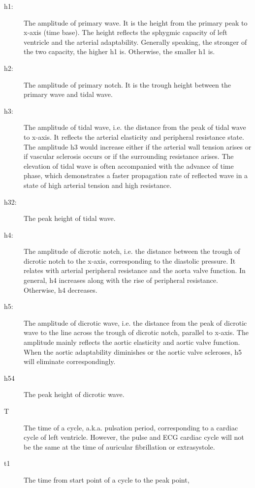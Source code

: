 \begin{description}
    \item[h1:] The amplitude of primary wave. It is the height from
        the primary peak to x-axis (time base). The height reflects
        the sphygmic capacity of left ventricle and the arterial
        adaptability. Generally speaking, the stronger of the two
        capacity, the higher h1 is. Otherwise, the smaller h1 is. 
    \item[h2:] The amplitude of primary notch. It is the trough
        height between the primary wave and tidal wave.
    \item[h3:] The amplitude of tidal wave, i.e. the distance from the
        peak of tidal wave to x-axis. It reflects the arterial
        elasticity and peripheral resistance state. The amplitude h3
        would increase either if the arterial wall tension arises or
        if vascular sclerosis occurs or if the surrounding resistance
        arises. The elevation of tidal wave is often accompanied with
        the advance of time phase, which demonstrates a faster
        propagation rate of reflected wave in a state of high arterial
        tension and high resistance. 
    \item[h32:] The peak height of tidal wave. 
    \item[h4:] The amplitude of dicrotic notch, i.e. the distance
        between the trough of dicrotic notch to the x-axis, 
        corresponding to the diastolic pressure. It relates with arterial
        peripheral resistance and the aorta valve function. In
        general, h4 increases along with the rise of peripheral
        resistance. Otherwise, h4 decreases. 
    \item[h5:] The amplitude of dicrotic wave, i.e. the distance
        from the peak of dicrotic wave to the line across the trough
        of dicrotic notch, parallel to x-axis. The amplitude mainly
        reflects the aortic elasticity and aortic valve function. When
        the aortic adaptability diminishes or the aortic valve
        scleroses, h5 will eliminate correspondingly.  
    \item[h54] The peak height of dicrotic wave.
    \item[T] The time of a cycle, a.k.a. pulsation period,
        corresponding to a cardiac cycle of left ventricle. However,
        the pulse and ECG cardiac cycle will not be the same at the
        time of auricular fibrillation or extrasystole. 
    \item[t1] The time from start point of a cycle to the peak point,

\end{description}
